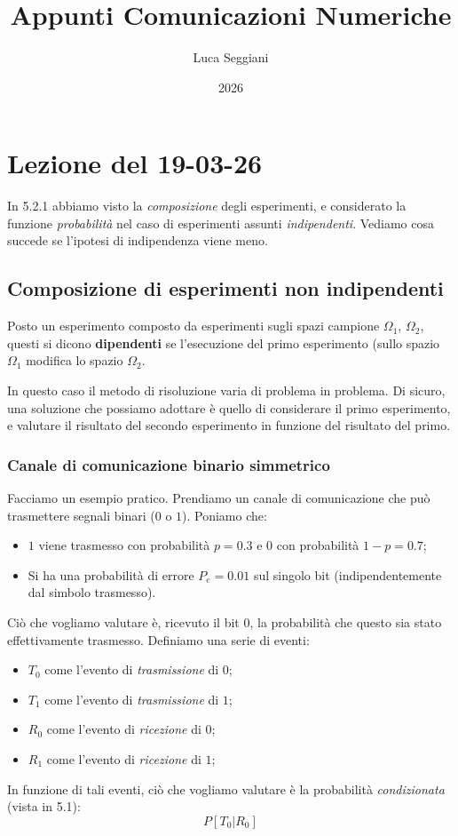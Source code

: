 \documentclass[a4paper,11pt]{article}
\title{Appunti Comunicazioni Numeriche}
\author{Luca Seggiani}
\date{2026}
\begin{document}
\section{Lezione del 19-03-26}

\thispagestyle{empty}
\pagestyle{fancy}

In 5.2.1 abbiamo visto la \textit{composizione} degli esperimenti, e considerato la funzione \textit{probabilità} nel caso di esperimenti assunti \textit{indipendenti}. Vediamo cosa succede se l'ipotesi di indipendenza viene meno.

\subsection{Composizione di esperimenti non indipendenti}
Posto un esperimento composto da esperimenti sugli spazi campione $\Omega_1$, $\Omega_2$, questi si dicono \textbf{dipendenti} se l'esecuzione del primo esperimento (sullo spazio $\Omega_1$ modifica lo spazio $\Omega_2$.

In questo caso il metodo di risoluzione varia di problema in problema. Di sicuro, una soluzione che possiamo adottare è quello di considerare il primo esperimento, e valutare il risultato del secondo esperimento in funzione del risultato del primo.

\subsubsection{Canale di comunicazione binario simmetrico}
Facciamo un esempio pratico. Prendiamo un canale di comunicazione che può trasmettere segnali binari ($0$ o $1$). Poniamo che:
\begin{itemize}
	\item $1$ viene trasmesso con probabilità $p = 0.3$ e 0 con probabilità $1 - p = 0.7$;
	\item Si ha una probabilità di errore $P_e = 0.01$ sul singolo bit (indipendentemente dal simbolo trasmesso).
\end{itemize}

Ciò che vogliamo valutare è, ricevuto il bit 0, la probabilità che questo sia stato effettivamente trasmesso.
Definiamo una serie di eventi:
\begin{itemize}
	\item $T_0$ come l'evento di \textit{trasmissione} di $0$;
	\item $T_1$ come l'evento di \textit{trasmissione} di $1$;
	\item $R_0$ come l'evento di \textit{ricezione} di $0$;
	\item $R_1$ come l'evento di \textit{ricezione} di $1$;
\end{itemize}
In funzione di tali eventi, ciò che vogliamo valutare è la probabilità \textit{condizionata} (vista in 5.1):
$$
P[T_0 | R_0]
$$
\end{document}
